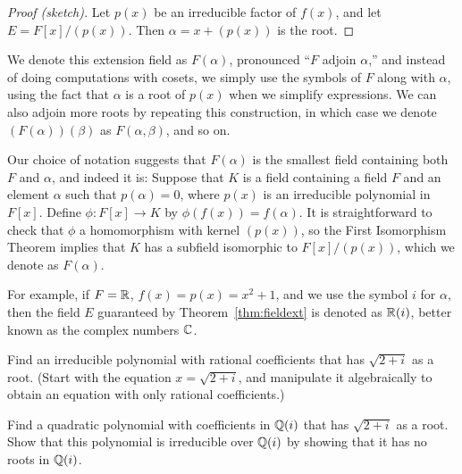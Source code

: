 \begin{proof}[Proof (sketch)]
    Let $p(x)$ be an irreducible factor of $f(x)$, and let $E=F[x]/(p(x))$. Then  $\alpha = x+(p(x))$ is the root.
\end{proof}

We denote this extension field as $F(\alpha)$, pronounced ``$F$ adjoin $\alpha$,'' and instead of doing computations with cosets, we simply use the symbols of $F$ along with $\alpha$, using the fact that $\alpha$ is a root of $p(x)$ when we simplify expressions. We can also adjoin more roots by repeating this construction, in which case we denote $(F(\alpha))(\beta)$ as $F(\alpha, \beta)$, and so on.

Our choice of notation suggests that $F(\alpha)$ is the smallest field containing both $F$ and $\alpha$, and indeed it is: Suppose that $K$ is a field containing a field $F$ and an element $\alpha$ such that $p(\alpha) = 0$, where $p(x)$ is an irreducible polynomial in $F[x]$. Define $\phi : F[x] \longrightarrow K$ by $\phi(f(x)) = f(\alpha)$. It is straightforward to check that $\phi$ a homomorphism with kernel $(p(x))$, so the First Isomorphism Theorem implies that $K$ has a subfield isomorphic to $F[x]/(p(x))$, which we denote as $F(\alpha)$.

For example, if $F = \mathbb{R}$, $f(x)=p(x)=x^2+1$, and we use the symbol $i$ for $\alpha$, then the field $E$ guaranteed by Theorem~\ref{thm:fieldext} is denoted as $\mathbb{R}(i)$, better known as the complex numbers $\mathbb{C}$.

\begin{problem}
    Find an irreducible polynomial with rational coefficients that has $\sqrt{2+i}$ as a root. (Start with the equation $x=\sqrt{2+i}$, and manipulate it algebraically to obtain an equation with only rational coefficients.)
\end{problem}

\begin{problem}
    Find a quadratic polynomial with coefficients in $\mathbb{Q}(i)$ that has $\sqrt{2+i}$ as a root. Show that this polynomial is irreducible over $\mathbb{Q}(i)$ by showing that it has no roots in $\mathbb{Q}(i)$.
\end{problem}

